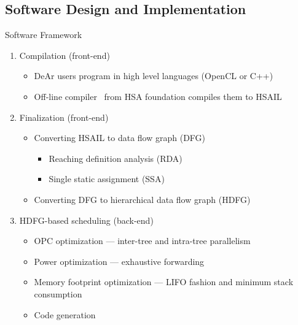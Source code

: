 \documentclass{beamer}
\begin{document}
\begin{CJK}{UTF8}{bkai}
            \subsection{Software Design and Implementation}
            \begin{frame}{Software Framework}
                \begin{enumerate}
                    \item <2->{Compilation (front-end)
                            \begin{itemize}
                                \item DeAr users program in high level languages (OpenCL or C++)
                                \item Off-line compiler~\cite{cloc} from HSA foundation compiles them to HSAIL
                            \end{itemize}
                        }
                    \item <3->{Finalization (front-end)
                            \begin{itemize}
                                \item Converting HSAIL to data flow graph (DFG)
                                    \begin{itemize}
                                        \item Reaching definition analysis (RDA)
                                        \item Single static assignment (SSA)
                                    \end{itemize}
                                \item Converting DFG to hierarchical data flow graph (HDFG)
                            \end{itemize}
                        }
                    \item <4->{HDFG-based scheduling (back-end)
                            \begin{itemize}
                                \item OPC optimization --- inter-tree and intra-tree parallelism
                                \item Power optimization --- exhaustive forwarding
                                \item Memory footprint optimization --- LIFO fashion and minimum stack consumption
                                \item Code generation
                            \end{itemize}
                        }
                \end{enumerate}
            \end{frame}



\end{CJK}
\end{document}
